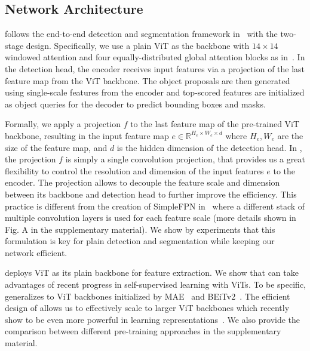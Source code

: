 \subsection{Network Architecture} 

\ours follows the end-to-end detection and segmentation framework in~\cite{nguyen2022boxer} with the two-stage design. Specifically, we use a plain ViT as the backbone with $14\times14$ windowed attention and four equally-distributed global attention blocks as in~\cite{li2022vitdet}. In the detection head, the \ours encoder receives input features via a projection of the last feature map from the ViT backbone. The object proposals are then generated using single-scale features from the encoder and top-scored features are initialized as object queries for the \ours decoder to predict bounding boxes and masks. 


Formally, we apply a projection $f$ to the last feature map of the pre-trained ViT backbone, resulting in the input feature map $e \in \mathbb{R}^{H_e \times W_e \times d}$ where $H_e, W_e$ are the size of the feature map, and $d$ is the hidden dimension of the detection head. In \ours, the projection $f$ is simply a single convolution projection, that provides us a great flexibility to control the resolution and dimension of the input features $e$ to the encoder. The projection allows \ours to decouple the feature scale and dimension between its backbone and detection head to further improve the efficiency. This practice is different from the creation of SimpleFPN in~\cite{li2022vitdet} where a different stack of multiple convolution layers is used for each feature scale (more details shown in Fig. A in the supplementary material). We show by experiments that this formulation is key for plain detection and segmentation while keeping our network efficient.

 \ours deploys ViT as its plain backbone for feature extraction. We show that \ours can take advantages of recent progress in self-supervised learning with ViTs. To be specific, \ours generalizes to ViT backbones initialized by MAE~\cite{he2022mae} and BEiTv2~\cite{peng2022beitv2}. The efficient design of \ours allows us to effectively scale to larger ViT backbones which recently show to be even more powerful in learning representations~\cite{he2022mae,zhai2022scalingvit,dehghani2023scalingvit22b}. We also provide the comparison between different pre-training approaches in the supplementary material.

